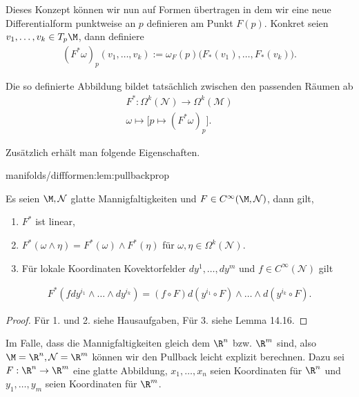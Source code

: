 \documentclass[letterpaper,10pt,german]{jupyterBook}
\begin{document}
\par
Dieses Konzept können wir nun auf Formen übertragen in dem wir eine neue Differentialform punktweise an \(p\) definieren am Punkt \(F(p)\). Konkret seien \(v_1,\ldots, v_k\in T_p\M\), dann definiere
\begin{align*}
(F^\ast\omega)_p (v_1,\ldots,v_k) := \omega_F(p)\big(F_\ast(v_1),\ldots,F_\ast(v_k)\big).
\end{align*}
\par
Die so definierte Abbildung bildet tatsächlich zwischen den passenden Räumen ab
\begin{align*}
F^\ast:\Omega^k(\mathcal{N})\to\Omega^k(\mathcal{M})\\
\omega\mapsto \big[ p\mapsto (F^\ast\omega)_p \big].
\end{align*}
\par
Zusätzlich erhält man folgende Eigenschaften.
\begin{lemma}{}{manifolds/diffformen:lem:pullbackprop}



\par
Es seien \(\M,\mathcal{N}\) glatte Mannigfaltigkeiten und \(F\in C^\infty(\M,\mathcal{N})\), dann gilt,
\begin{enumerate}

\item {} 
\par
\(F^\ast\) ist linear,

\item {} 
\par
\(F^\ast(\omega\wedge\eta) = F^\ast(\omega) \wedge F^\ast(\eta)\) für \(\omega,\eta\in\Omega^k(\mathcal{N})\).

\item {} 
\par
Für lokale Koordinaten Kovektorfelder \(dy^1,\ldots,dy^m\) und \(f\in C^\infty(\mathcal{N})\) gilt

\end{enumerate}
\begin{align*}
F^\ast(f dy^{i_1}\wedge\ldots\wedge dy^{i_k}) = (f \circ F) d(y^{i_1}\circ F)\wedge\ldots\wedge d(y^{i_k}\circ F).
\end{align*}\end{lemma}

\begin{proof}
 Für 1. und 2. siehe Hausaufgaben, Für 3. siehe \cite{Lee03} Lemma 14.16.
\end{proof}

\par
Im Falle, dass die Mannigfaltigkeiten gleich dem \(\R^n\) bzw. \(\R^m\) sind, also \(\M=\R^n, \mathcal{N}=\R^m\) können wir den Pullback leicht explizit berechnen. Dazu sei \(F:\R^n\to\R^m\) eine glatte Abbildung, \(x_1,\ldots,x_n\) seien Koordinaten für \(\R^n\) und \(y_1,\ldots,y_m\) seien Koordinaten für \(\R^m\).
\end{document}
